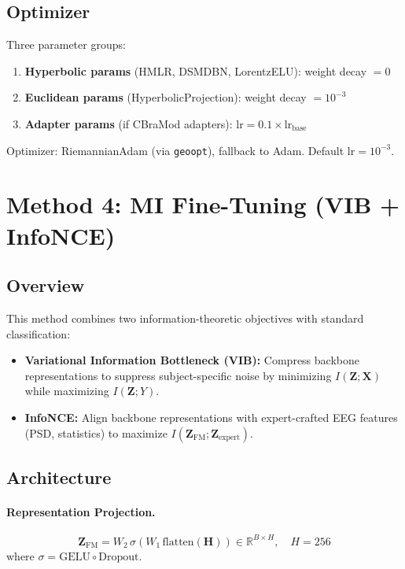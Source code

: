 \documentclass{article}
\newcommand{\R}{\mathbb{R}}
\begin{document}
\subsection{Optimizer}

Three parameter groups:
\begin{enumerate}
\item \textbf{Hyperbolic params} (HMLR, DSMDBN, LorentzELU): weight decay $= 0$
\item \textbf{Euclidean params} (HyperbolicProjection): weight decay $= 10^{-3}$
\item \textbf{Adapter params} (if CBraMod adapters): $\text{lr} = 0.1 \times \text{lr}_\text{base}$
\end{enumerate}
Optimizer: RiemannianAdam (via \texttt{geoopt}), fallback to Adam. Default $\text{lr} = 10^{-3}$.

\section{Method 4: MI Fine-Tuning (VIB + InfoNCE)}
\label{sec:mi}

\subsection{Overview}

This method combines two information-theoretic objectives with standard classification:
\begin{itemize}
\item \textbf{Variational Information Bottleneck (VIB):} Compress backbone representations to suppress subject-specific noise by minimizing $I(\bm{Z}; \bm{X})$ while maximizing $I(\bm{Z}; Y)$.
\item \textbf{InfoNCE:} Align backbone representations with expert-crafted EEG features (PSD, statistics) to maximize $I(\bm{Z}_\text{FM}; \bm{Z}_\text{expert})$.
\end{itemize}

\subsection{Architecture}

\paragraph{Representation Projection.}
\begin{equation}
\bm{Z}_\text{FM} = W_2\, \sigma(W_1\, \text{flatten}(\bm{H})) \in \R^{B \times H}, \quad H = 256
\end{equation}
where $\sigma = \text{GELU} \circ \text{Dropout}$.
\end{document}
